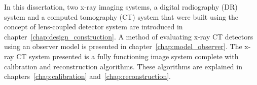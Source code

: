 In this dissertation, two x-ray imaging systems, a digital radiography (DR) system and a computed tomography (CT) system that were built using the concept of lens-coupled detector system are introduced in chapter~\ref{chap:design_construction}.  A method of evaluating x-ray CT detectors using an observer model is presented in chapter~\ref{chap:model_observer}.   The x-ray CT system presented is a fully functioning image system complete with calibration and reconstruction algorithms.  These algorithms are explained in chapters~\ref{chap:calibration} and~\ref{chap:reconstruction}.

%
%
